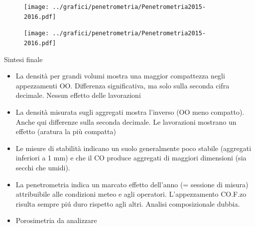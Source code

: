 \begin{frame}
  \begin{figure}[ht]
    \texttt{[image: ../grafici/penetrometria/Penetrometria2015-2016.pdf]}
  \end{figure}
\end{frame}

\begin{frame}
  \begin{figure}[ht]
    \texttt{[image: ../grafici/penetrometria/Penetrometria2015-2016.pdf]}
  \end{figure}
\end{frame}

\begin{frame}{Sintesi finale}
  \begin{itemize}[<+->]
  \item La densit\`a per grandi volumi mostra una maggior compattezza
    negli appezzamenti OO. Differenza significativa, ma solo sulla
    seconda cifra decimale. Nessun effetto delle lavorazioni
  \item La densit\`a misurata sugli aggregati mostra l'inverso (OO
    meno compatto). Anche qui differenze sulla seconda decimale. Le
    lavorazioni mostrano un effetto (aratura la pi\`u compatta)
  \item Le misure di stabilit\`a indicano un suolo generalmente poco
    stabile (aggregati inferiori a 1 mm) e che il CO produce aggregati
    di maggiori dimensioni (sia secchi che umidi).
  \item La penetrometria indica un marcato effetto dell'anno (=
    sessione di misura) attribuibile alle condizioni meteo e agli
    operatori. L'appezzamento CO.F.zo risulta sempre pi\'u duro
    rispetto agli altri. Analisi composizionale dubbia.
    \item Porosimetria da analizzare
  \end{itemize}
  
\end{frame}







